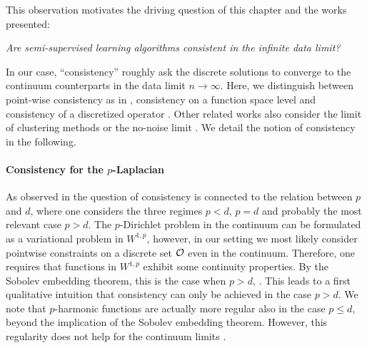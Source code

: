 %
%
\noindent%
This observation motivates the driving question of this chapter and the works presented:
%
\begin{center}
\textit{%
Are semi-supervised learning algorithms consistent in the infinite data limit?}
\end{center}
%
In our case, \enquote{consistency} roughly ask the discrete solutions to converge to the continuum counterparts in the data limit $n\to\infty$. Here, we distinguish between point-wise consistency as in \cite{von2008consistency, gine2006empirical, hein2005graphs}, consistency on a function space level \cite{slepcev2019analysis, GarcSlep15,calder2019consistency, roith2022continuum} and consistency of a discretized operator \cite{calder2019consistency, bungert2021uniform}. Other related works also consider the limit of clustering methods \cite{hoffmann2022spectral, trillos2018variational} or the no-noise limit \cite{hoffmann2020consistency, dunlop2020large}. We detail the notion of consistency in the following.  
%
%
\paragraph{Consistency for the $p$-Laplacian} 
As observed in \cite{nadler2009statistical, alamgir2011phase, el2016asymptotic, calder2020properly} the question of consistency is connected to the relation between $p$ and $d$, where one considers the three regimes $p<d$, $p=d$ and probably the most relevant case $p>d$. The $p$-Dirichlet problem in the continuum can be formulated as a variational problem in $W^{1,p}$, however, in our setting we most likely consider pointwise constraints on a discrete set $\mathcal{O}$ even in the continuum. Therefore, one requires that functions in $W^{1,p}$ exhibit some continuity properties. By the Sobolev embedding theorem, this is the case when $p>d$, \cite{adams2003sobolev}. This leads to a first qualitative intuition that consistency can only be achieved in the case $p>d$. We note that $p$-harmonic functions are actually more regular also in the case $p\leq d$, beyond the implication of the Sobolev embedding theorem. However, this regularity does not help for the continuum limits \cite{nadler2009statistical, alamgir2011phase, el2016asymptotic}.

